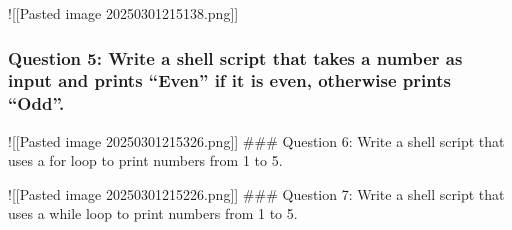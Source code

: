 !{[}{[}Pasted image 20250301215138.png{]}{]}

\subsubsection{Question 5: Write a shell script that takes a number as
input and prints ``Even'' if it is even, otherwise prints
``Odd''.}\label{question-5-write-a-shell-script-that-takes-a-number-as-input-and-prints-even-if-it-is-even-otherwise-prints-odd.}

\begin{Shaded}
\begin{Highlighting}[]
   
 \KeywordTok{((} \OperatorTok{\%}  \OperatorTok{==} \KeywordTok{));} 
     
     
\end{Highlighting}
\end{Shaded}

!{[}{[}Pasted image 20250301215326.png{]}{]} \#\#\# Question 6: Write a
shell script that uses a for loop to print numbers from 1 to 5.

\begin{Shaded}
\begin{Highlighting}[]
 \DataTypeTok{\{}\DataTypeTok{\}}\KeywordTok{;} 
     
\end{Highlighting}
\end{Shaded}

!{[}{[}Pasted image 20250301215226.png{]}{]} \#\#\# Question 7: Write a
shell script that uses a while loop to print numbers from 1 to 5.

\begin{Shaded}
\begin{Highlighting}[]
\OperatorTok{=}
 \BuiltInTok{[}  \BuiltInTok{]}\KeywordTok{;} 
     
    \KeywordTok{((}\OperatorTok{++}\KeywordTok{))}
\end{Highlighting}
\end{Shaded}

